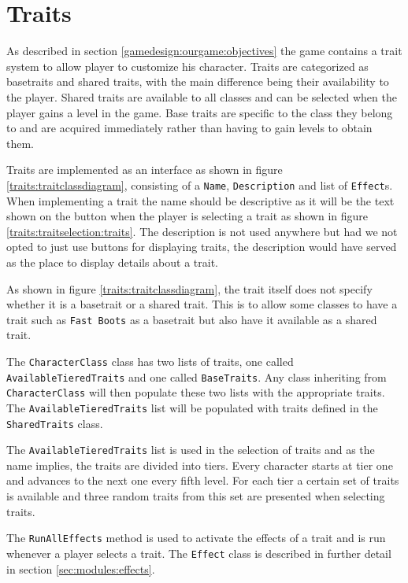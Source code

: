 \section{Traits}
\label{sec:modules:traits}

As described in section \ref{gamedesign:ourgame:objectives} the game contains a trait system to allow player to customize his character. Traits are categorized as basetraits and shared traits, with the main difference being their availability to the player.
Shared traits are available to all classes and can be selected when the player gains a level in the game.
Base traits are specific to the class they belong to and are acquired immediately rather than having to gain levels to obtain them.

Traits are implemented as an interface as shown in figure \ref{traits:traitclassdiagram}, consisting of a \texttt{Name}, \texttt{Description} and list of \texttt{Effect}s. When implementing a trait the name should be descriptive as it will be the text shown on the button when the player is selecting a trait as shown in figure \ref{traits:traitselection:traits}. 
The description is not used anywhere but had we not opted to just use buttons for displaying traits, the description would have served as the place to display details about a trait.

As shown in figure \ref{traits:traitclassdiagram}, the trait itself does not specify whether it is a basetrait or a shared trait. This is to allow some classes to have a trait such as \texttt{Fast Boots} as a basetrait but also have it available as a shared trait.

The \texttt{CharacterClass} class has two lists of traits, one called \texttt{AvailableTieredTraits} and one called \texttt{BaseTraits}. Any class inheriting from \texttt{CharacterClass} will then populate these two lists with the appropriate traits. The \texttt{AvailableTieredTraits} list will be populated with traits defined in the \texttt{SharedTraits} class.

The \texttt{AvailableTieredTraits} list is used in the selection of traits and as the name implies, the traits are divided into tiers. Every character starts at tier one and advances to the next one every fifth level. For each tier a certain set of traits is available and three random traits from this set are presented when selecting traits.

The \texttt{RunAllEffects} method is used to activate the effects of a trait and is run whenever a player selects a trait. The \texttt{Effect} class is described in further detail in section \ref{sec:modules:effects}.



